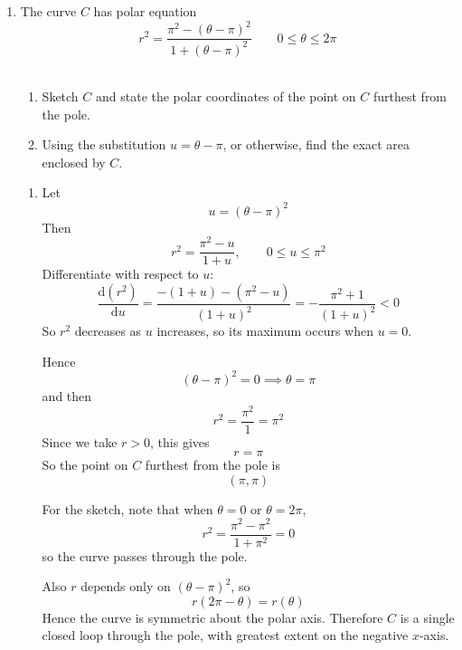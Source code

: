 \documentclass[leqno]{article}
\newcommand{\questionitem}{%
	  \item\phantomsection
	  \addcontentsline{toc}{section}{Question \number\value{enumi}}%
	}
\begin{document}
\begin{enumerate}[
	  label=\textbf{\arabic*.},
	  leftmargin=*,
	  topsep=0pt,
	  partopsep=0pt,
	  parsep=0pt
	]
\begin{tcolorbox}[colback=white, colframe=scarlet, title={\textbf{Solution}}, breakable, grow to left by=6mm, grow to right by=10mm]
	Hence the exact area of the shaded region is
	\[
	\frac{\pi}{2}+\frac{3\sqrt3}{4}
	\]
	\end{tcolorbox}
	
	
	\newpage
	
	\questionitem
	
	The curve $C$ has polar equation
	\[
	r^2=\frac{\pi^2-(\theta-\pi)^2}{1+(\theta-\pi)^2}\qquad 0\leq\theta\leq2\pi
	\] \\
	\begin{enumerate}[label=\textbf{(\alph*)}]
	  \item Sketch $C$ and state the polar coordinates of the point on $C$ furthest from the pole.  \\
	  \item Using the substitution $u=\theta-\pi$, or otherwise, find the exact area enclosed by $C$.  \\
	\end{enumerate}
	
	\vspace*{30pt}
	
	\begin{tcolorbox}[colback=white, colframe=scarlet, title={\textbf{Solution}}, breakable, grow to left by=6mm, grow to right by=10mm]
	\begin{enumerate}[label=\textbf{(\alph*)}]
	  \item Let
	  \[
	  u=(\theta-\pi)^2
	  \]
	  Then
	  \[
	  r^2=\frac{\pi^2-u}{1+u}, \qquad 0\le u\le \pi^2
	  \]
	  Differentiate with respect to \(u\):
	  \[
	  \frac{\mathrm{d}(r^2)}{\mathrm{d}u}
	  =\frac{-(1+u)-(\pi^2-u)}{(1+u)^2}
	  =-\frac{\pi^2+1}{(1+u)^2}<0
	  \]
	  So \(r^2\) decreases as \(u\) increases, so its maximum occurs when \(u=0\).
	
	  Hence
	  \[
	  (\theta-\pi)^2=0 \implies \theta=\pi
	  \]
	  and then
	  \[
	  r^2=\frac{\pi^2}{1}=\pi^2
	  \]
	  Since we take \(r>0\), this gives
	  \[
	  r=\pi
	  \]
	  So the point on \(C\) furthest from the pole is
	  \[
	  (\pi,\pi)
	  \]
	
	  For the sketch, note that when \(\theta=0\) or \(\theta=2\pi\),
	  \[
	  r^2=\frac{\pi^2-\pi^2}{1+\pi^2}=0
	  \]
	  so the curve passes through the pole.
	
	  Also \(r\) depends only on \((\theta-\pi)^2\), so
	  \[
	  r(2\pi-\theta)=r(\theta)
	  \]
	  Hence the curve is symmetric about the polar axis. Therefore \(C\) is a single closed loop through the pole, with greatest extent on the negative \(x\)-axis.
	

\end{enumerate}
\end{tcolorbox}
\end{enumerate}
\end{document}
